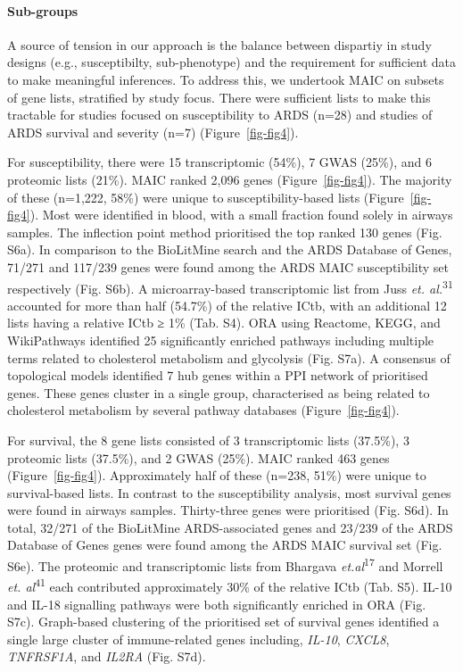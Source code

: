 \documentclass[
  11,
  a4paper,
]{article}
\let\oldparagraph\paragraph
\renewcommand{\paragraph}[1]{\oldparagraph{#1}\mbox{}}
\begin{document}
\hypertarget{sub-groups}{%
\paragraph{Sub-groups}\label{sub-groups}}

A source of tension in our approach is the balance between dispartiy in
study designs (e.g., susceptibilty, sub-phenotype) and the requirement
for sufficient data to make meaningful inferences. To address this, we
undertook MAIC on subsets of gene lists, stratified by study focus.
There were sufficient lists to make this tractable for studies focused
on susceptibility to ARDS (n=28) and studies of ARDS survival and
severity (n=7) (Figure~\ref{fig-fig4}).

For susceptibility, there were 15 transcriptomic (54\%), 7 GWAS (25\%),
and 6 proteomic lists (21\%). MAIC ranked 2,096 genes
(Figure~\ref{fig-fig4}). The majority of these (n=1,222, 58\%) were
unique to susceptibility-based lists (Figure~\ref{fig-fig4}). Most were
identified in blood, with a small fraction found solely in airways
samples. The inflection point method prioritised the top ranked 130
genes (Fig. S6a). In comparison to the BioLitMine search and the ARDS
Database of Genes, 71/271 and 117/239 genes were found among the ARDS
MAIC susceptibility set respectively (Fig. S6b). A microarray-based
transcriptomic list from Juss \emph{et. al.}\textsuperscript{31}
accounted for more than half (54.7\%) of the relative ICtb, with an
additional 12 lists having a relative ICtb ≥ 1\% (Tab. S4). ORA using
Reactome, KEGG, and WikiPathways identified 25 significantly enriched
pathways including multiple terms related to cholesterol metabolism and
glycolysis (Fig. S7a). A consensus of topological models identified 7
hub genes within a PPI network of prioritised genes. These genes cluster
in a single group, characterised as being related to cholesterol
metabolism by several pathway databases (Figure~\ref{fig-fig4}).

For survival, the 8 gene lists consisted of 3 transcriptomic lists
(37.5\%), 3 proteomic lists (37.5\%), and 2 GWAS (25\%). MAIC ranked 463
genes (Figure~\ref{fig-fig4}). Approximately half of these (n=238, 51\%)
were unique to survival-based lists. In contrast to the susceptibility
analysis, most survival genes were found in airways samples.
Thirty-three genes were prioritised (Fig. S6d). In total, 32/271 of the
BioLitMine ARDS-associated genes and 23/239 of the ARDS Database of
Genes genes were found among the ARDS MAIC survival set (Fig. S6e). The
proteomic and transcriptomic lists from Bhargava
\emph{et.al}\textsuperscript{17} and Morrell \emph{et.
al}\textsuperscript{41} each contributed approximately 30\% of the
relative ICtb (Tab. S5). IL-10 and IL-18 signalling pathways were both
significantly enriched in ORA (Fig. S7c). Graph-based clustering of the
prioritised set of survival genes identified a single large cluster of
immune-related genes including, \emph{IL-10}, \emph{CXCL8},
\emph{TNFRSF1A}, and \emph{IL2RA} (Fig. S7d).
\end{document}
